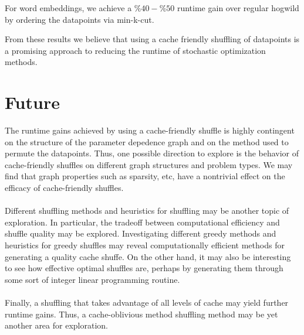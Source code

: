 \documentclass[times,11pt]{article}
\numberwithin{equation}{section}		%
\numberwithin{figure}{section}			%
\numberwithin{table}{section}				%
\begin{document}

For word embeddings, we achieve a $\%40-\%50$ runtime gain over regular hogwild by ordering the datapoints via min-k-cut.

From these results we believe that using a cache friendly shuffling of datapoints is a promising approach to reducing the runtime of stochastic optimization methods.

\newpage
\section{Future}
The runtime gains achieved by using a cache-friendly shuffle is highly
contingent on the structure of the parameter depedence graph and on
the method used to permute the datapoints. Thus, one possible
direction to explore is the behavior of cache-friendly shuffles on
different graph structures and problem types. We may find that graph
properties such as sparsity, etc, have a nontrivial effect on the
efficacy of cache-friendly shuffles.
\\\\
Different shuffling methods and
heuristics for shuffling may be another topic of exploration. In
particular, the tradeoff between computational efficiency and shuffle
quality may be explored. Investigating different greedy methods and heuristics for
greedy shuffles may reveal computationally efficient methods for
generating a quality cache shuffe. On the other hand, it may also be
interesting to see how effective optimal shuffles are, perhaps by
generating them through some sort of integer linear programming
routine.
\\\\
Finally, a shuffling that takes advantage of all levels of cache may yield further runtime gains.
Thus, a cache-oblivious method shuffling method may be yet another area for exploration.
\end{document}
